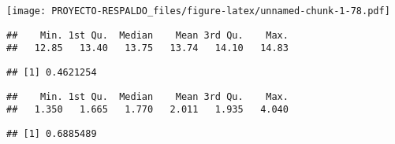 \documentclass[
]{article}
\newenvironment{Shaded}{\begin{snugshade}}{\end{snugshade}}
\newcommand{\CommentTok}[1]{\textcolor[rgb]{0.56,0.35,0.01}{\textit{#1}}}
\newcommand{\DataTypeTok}[1]{\textcolor[rgb]{0.13,0.29,0.53}{#1}}
\newcommand{\KeywordTok}[1]{\textcolor[rgb]{0.13,0.29,0.53}{\textbf{#1}}}
\newcommand{\NormalTok}[1]{#1}
\newcommand{\OperatorTok}[1]{\textcolor[rgb]{0.81,0.36,0.00}{\textbf{#1}}}
\newcommand{\StringTok}[1]{\textcolor[rgb]{0.31,0.60,0.02}{#1}}
\begin{document}
\texttt{[image: PROYECTO-RESPALDO\_files/figure-latex/unnamed-chunk-1-78.pdf]}

\begin{Shaded}
\end{Shaded}

\begin{verbatim}
##    Min. 1st Qu.  Median    Mean 3rd Qu.    Max. 
##   12.85   13.40   13.75   13.74   14.10   14.83
\end{verbatim}

\begin{Shaded}
\end{Shaded}

\begin{verbatim}
## [1] 0.4621254
\end{verbatim}

\begin{Shaded}
\end{Shaded}

\begin{verbatim}
##    Min. 1st Qu.  Median    Mean 3rd Qu.    Max. 
##   1.350   1.665   1.770   2.011   1.935   4.040
\end{verbatim}

\begin{Shaded}
\end{Shaded}

\begin{verbatim}
## [1] 0.6885489
\end{verbatim}

\begin{Shaded}
\end{Shaded}
\end{document}
